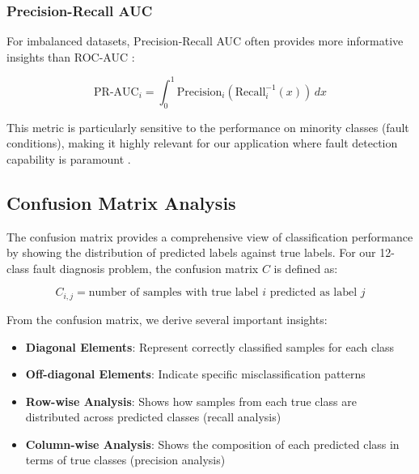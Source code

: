 \subsubsection{Precision-Recall AUC}
\label{subsubsec:pr_auc}

For imbalanced datasets, Precision-Recall AUC often provides more informative insights than ROC-AUC \citep{saito2015precision, davis2006relationship}:

\begin{equation}
\text{PR-AUC}_i = \int_{0}^{1} \text{Precision}_i(\text{Recall}_i^{-1}(x)) \, dx
\end{equation}

This metric is particularly sensitive to the performance on minority classes (fault conditions), making it highly relevant for our application where fault detection capability is paramount \citep{chawla2002smote, krawczyk2016learning}.

\subsection{Confusion Matrix Analysis}
\label{subsec:confusion_matrix}

The confusion matrix provides a comprehensive view of classification performance by showing the distribution of predicted labels against true labels. For our 12-class fault diagnosis problem, the confusion matrix $C$ is defined as:

\begin{equation}
C_{i,j} = \text{number of samples with true label } i \text{ predicted as label } j
\end{equation}

From the confusion matrix, we derive several important insights:

\begin{itemize}
    \item \textbf{Diagonal Elements}: Represent correctly classified samples for each class
    \item \textbf{Off-diagonal Elements}: Indicate specific misclassification patterns
    \item \textbf{Row-wise Analysis}: Shows how samples from each true class are distributed across predicted classes (recall analysis)
    \item \textbf{Column-wise Analysis}: Shows the composition of each predicted class in terms of true classes (precision analysis)
\end{itemize}

